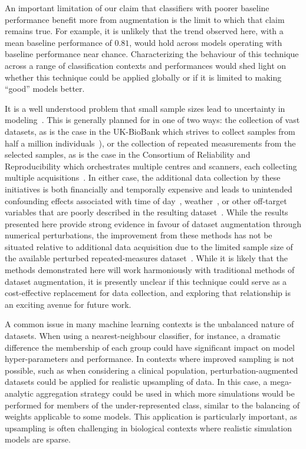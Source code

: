 \documentclass[10pt]{SelfArx} %
\begin{document}
An important limitation of our claim that classifiers with poorer baseline performance benefit more from augmentation
is the limit to which that claim remains true. For example, it is unlikely that the trend observed here, with a mean
baseline performance of $0.81$, would hold across models operating with baseline performance near chance.
Characterizing the behaviour of this technique across a range of classification contexts and performances would shed
light on whether this technique could be applied globally or if it is limited to making ``good'' models better.

It is a well understood problem that small sample sizes lead to uncertainty in modeling~\cite{varoquaux2018cross}.
This is generally planned for in one of two ways: the collection of vast datasets, as is the case in the UK-BioBank
which strives to collect samples from half a million individuals~\cite{sudlow2015uk}), or the collection of repeated
measurements from the selected samples, as is the case in the Consortium of Reliability and Reproducibility which
orchestrates multiple centres and scanners, each collecting multiple acquisitions~\cite{zuo2014open}. In either case,
the additional data collection by these initiatives is both financially and temporally expensive and leads to
unintended confounding effects associated with time of day~\cite{vandewalle2009functional},
weather~\cite{di2019estimations}, or other off-target variables that are poorly described in the resulting
dataset~\cite{chaddock2010neuroimaging}. While the results presented here provide strong evidence in favour of dataset
augmentation through numerical perturbations, the improvement from these methods has not be situated relative to
additional data acquisition due to the limited sample size of the available perturbed repeated-measures
dataset~\cite{Kiar2020-yz}. While it is likely that the methods demonstrated here will work harmoniously with
traditional methods of dataset augmentation, it is presently unclear if this technique could serve as a cost-effective
replacement for data collection, and exploring that relationship is an exciting avenue for future work.

A common issue in many machine learning contexts is the unbalanced nature of datasets. When using a nearest-neighbour
classifier, for instance, a dramatic difference the membership of each group could have significant impact on model
hyper-parameters and performance. In contexts where improved sampling is not possible, such as when considering a
clinical population, perturbation-augmented datasets could be applied for realistic upsampling of data. In this case, a
mega-analytic aggregation strategy could be used in which more simulations would be performed for members of the
under-represented class, similar to the balancing of weights applicable to some models. This application is
particularly important, as upsampling is often challenging in biological contexts where realistic simulation models are
sparse.
\end{document}
